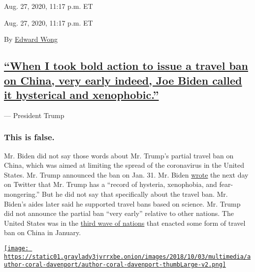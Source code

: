 Aug. 27, 2020, 11:17 p.m. ET

Aug. 27, 2020, 11:17 p.m. ET

By \href{https://www.nytimes3xbfgragh.onion/by/edward-wong}{Edward Wong}

\hypertarget{when-i-took-bold-action-to-issue-a-travel-ban-on-china-very-early-indeed-joe-biden-called-it-hysterical-and-xenophobic}{%
\subsection{\texorpdfstring{\protect\hyperlink{when-i-took-bold-action-to-issue-a-travel-ban-on-china-very-early-indeed-joe-biden-called-it-hysterical-and-xenophobic}{``When
I took bold action to issue a travel ban on China, very early indeed,
Joe Biden called it hysterical and
xenophobic.''}}{``When I took bold action to issue a travel ban on China, very early indeed, Joe Biden called it hysterical and xenophobic.''}}\label{when-i-took-bold-action-to-issue-a-travel-ban-on-china-very-early-indeed-joe-biden-called-it-hysterical-and-xenophobic}}

--- President Trump

\hypertarget{this-is-false-1}{%
\subsubsection{\texorpdfstring{\textbf{This is
false.}}{This is false.}}\label{this-is-false-1}}

Mr. Biden did not say those words about Mr. Trump's partial travel ban
on China, which was aimed at limiting the spread of the coronavirus in
the United States. Mr. Trump announced the ban on Jan. 31. Mr. Biden
\href{https://twitter.com/JoeBiden/status/1223727977361338370?s=20}{wrote}
the next day on Twitter that Mr. Trump has a ``record of hysteria,
xenophobia, and fear-mongering.'' But he did not say that specifically
about the travel ban. Mr. Biden's aides later said he supported travel
bans based on science. Mr. Trump did not announce the partial ban ``very
early'' relative to other nations. The United States was in the
\href{https://www.washingtonpost.com/politics/2020/04/07/trumps-claim-that-he-imposed-first-china-ban/}{third
wave of nations} that enacted some form of travel ban on China in
January.

\href{https://www.nytimes3xbfgragh.onion/by/coral-davenport}{\texttt{[image: https://static01.graylady3jvrrxbe.onion/images/2018/10/03/multimedia/author-coral-davenport/author-coral-davenport-thumbLarge-v2.png]}}

